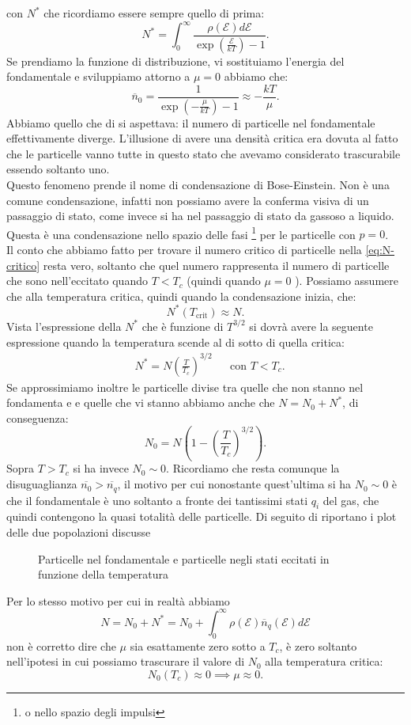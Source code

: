 con $N^{*}$ che ricordiamo essere sempre quello di prima:
\[
	N^{*} = \int_{0}^{\infty} 
	\frac{\rho( \mathcal{E} ) d\mathcal{E} }
	{\exp\left( \frac{\mathcal{E} }{kT} \right) -1} 
.\] 
Se prendiamo la funzione di distribuzione, vi sostituiamo l'energia del fondamentale e sviluppiamo attorno a $\mu = 0$ abbiamo che:
\[
	\overline{n}_{0} = \frac{1}
		{\exp\left( -\frac{\mu }{kT} \right) -1 } \approx - \frac{kT}{\mu }
.\] 
Abbiamo quello che di si aspettava: il numero di particelle nel fondamentale effettivamente diverge. L'illusione di avere una densità critica era dovuta al fatto che le particelle vanno tutte in questo stato che avevamo considerato trascurabile essendo soltanto uno. \\ 
Questo fenomeno prende il nome di condensazione di Bose-Einstein. 
Non è una comune condensazione, infatti non possiamo avere la conferma visiva di un passaggio di stato, come invece si ha nel passaggio di stato da gassoso a liquido. 
Questa è una condensazione nello spazio delle fasi \footnote{o nello spazio degli impulsi} per le particelle con $p =0$. \\
Il conto che abbiamo fatto per trovare il numero critico di particelle nella \ref{eq:N-critico} resta vero, soltanto che quel numero rappresenta il numero di particelle che sono nell'eccitato quando $T< T_{c}$ (quindi quando $\mu = 0$ ). Possiamo assumere che alla temperatura critica, quindi quando la condensazione inizia, che:
\[
	N^{*}( T_{\text{crit}})  \approx N
.\] 
Vista l'espressione della $N^{*}$ che è funzione di $T^{3 /2}$ si dovrà avere la seguente espressione quando la temperatura scende al di sotto di quella critica:
\begin{align}
	&N^{*} = N \left( \frac{T}{T_{c}} \right)^{3 /2}& & \text{con } T<T_{c}
.\end{align}
Se approssimiamo inoltre le particelle divise tra quelle che non stanno nel fondamenta e e quelle che vi stanno abbiamo anche che $N = N_0 + N^{*}$, di conseguenza:
\[
	N_0 = N\left( 1 -\left( \frac{T}{T_{c}} \right)^{3 /2}
 \right) 
.\] 
Sopra $T>T_{c}$ si ha invece $N_0 \sim 0$. Ricordiamo che resta comunque la disuguaglianza $\overline{n_0}>\overline{n_{q}}$, il motivo per cui nonostante quest'ultima si ha $N_0 \sim 0$ è che il fondamentale è uno soltanto a fronte dei tantissimi stati $q_{i}$ del gas, che quindi contengono la quasi totalità delle particelle. Di seguito di riportano i plot delle due popolazioni discusse
\begin{figure}[H]
    \centering
    \caption{Particelle nel fondamentale e particelle negli stati eccitati in funzione della temperatura}
    \label{fig:particelle-nel-fondamentale-e-particelle-negli-stati-eccitati-in-funzione-della-temperatura}
\end{figure}
\noindent
Per lo stesso motivo per cui in realtà abbiamo 
\[
	N = N_0 + N^{*}= N_0 + 
	\int_{0}^{\infty} 
	\rho ( \mathcal{E} )\overline{n}_{q}( \mathcal{E} ) 
	d\mathcal{E} 
\]
non è corretto dire che $\mu $ sia esattamente zero sotto a $T_{c}$, è zero soltanto nell'ipotesi in cui possiamo trascurare il valore di $N_0$ alla temperatura critica:
\[
	N_0( T_{c}) \approx 0 \implies \mu \approx 0
.\] 
